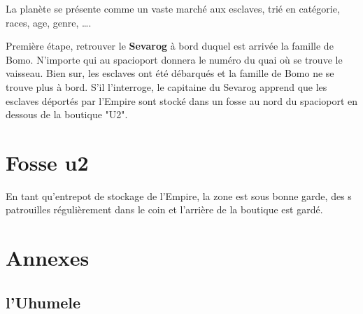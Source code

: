 \documentclass{jdrp}
\begin{document}
	La planète se présente comme un vaste marché aux esclaves, trié en catégorie, races, age, genre, \ldots.

	Première étape, retrouver le \textbf{Sevarog} à bord duquel est arrivée la famille de Bomo. N’importe qui au spacioport donnera le numéro du quai où se trouve le vaisseau. Bien sur, les esclaves ont été débarqués et la famille de Bomo ne se trouve plus à bord. S’il l'interroge, le capitaine du Sevarog apprend que les esclaves déportés par l’Empire sont stocké dans un fosse au nord du spacioport en dessous de la boutique "U2".

	\section{Fosse u2}
	En tant qu’entrepot de stockage de l’Empire, la zone est sous bonne garde, des s patrouilles régulièrement dans le coin et l’arrière de la boutique est gardé.

	\section{Annexes}
	\subsection{l’Uhumele}\label{sec:uhumele}


	

	\onecolumn
	\nocite{*}
	\printbibliography
\end{document}
